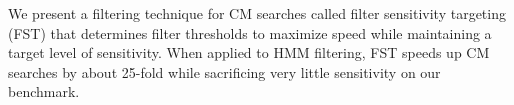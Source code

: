 We present a filtering technique for CM searches called filter
sensitivity targeting (FST) that determines filter thresholds to
maximize speed while maintaining a target level of sensitivity. When
applied to HMM filtering, FST speeds up CM searches by about 25-fold
while sacrificing very little sensitivity on our benchmark.
